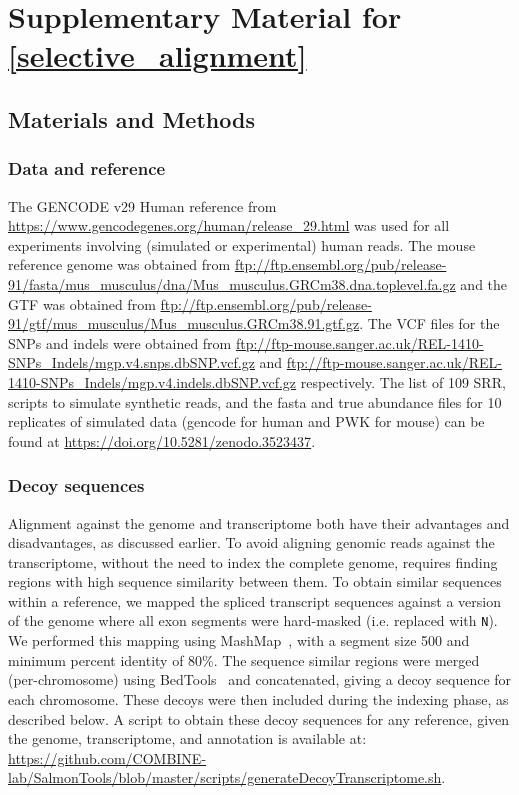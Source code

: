 
\chapter{Supplementary Material for \cref{selective_alignment}} %
\label{appendix-selal}

\section{Materials and Methods}

\subsection{Data and reference}
\label{subsec:meth_accessions}

The GENCODE v29 Human reference from
\url{https://www.gencodegenes.org/human/release_29.html} was used for all
experiments involving (simulated or experimental) human reads. The mouse
reference genome was obtained from
\url{ftp://ftp.ensembl.org/pub/release-91/fasta/mus_musculus/dna/Mus_musculus.GRCm38.dna.toplevel.fa.gz}
and the GTF was obtained from
\url{ftp://ftp.ensembl.org/pub/release-91/gtf/mus_musculus/Mus_musculus.GRCm38.91.gtf.gz}.
The VCF files for the SNPs and indels were obtained from
\url{ftp://ftp-mouse.sanger.ac.uk/REL-1410-SNPs_Indels/mgp.v4.snps.dbSNP.vcf.gz}
and
\url{ftp://ftp-mouse.sanger.ac.uk/REL-1410-SNPs_Indels/mgp.v4.indels.dbSNP.vcf.gz}
respectively. The list of 109 SRR, scripts to simulate synthetic reads, and the fasta
and true abundance files for 10 replicates of simulated data (gencode for human
and PWK for mouse) can be found at
\url{https://doi.org/10.5281/zenodo.3523437}.

\subsection{Decoy sequences}
\label{subsec:meth_decoy}

Alignment against the genome and transcriptome both have their advantages and
disadvantages, as discussed earlier. To avoid aligning genomic reads against
the transcriptome, without the need to index the complete genome, requires
finding regions with high sequence similarity between them. To obtain similar
sequences within a reference, we mapped the spliced transcript sequences against
a version of the genome where all exon segments were hard-masked (i.e.\@
replaced with \texttt{N}). We performed this mapping using
MashMap~\cite{jain2018fast}, with a segment size 500 and minimum percent
identity of 80\%. The sequence similar regions were merged (per-chromosome)
using BedTools~\cite{quinlan2010bedtools} and concatenated, giving a decoy
sequence for each chromosome. These decoys were then included during the
\salmon indexing phase, as described below. A script to obtain these decoy
sequences for any reference, given the genome, transcriptome, and annotation
is available at: \url{https://github.com/COMBINE-lab/SalmonTools/blob/master/scripts/generateDecoyTranscriptome.sh}.

